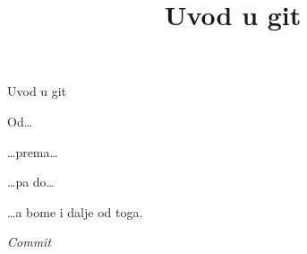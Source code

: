 \documentclass[11pt,twoside,a4paper]{report}
\title{Uvod u git}
\begin{document}
\begin{titlepage}
	\vspace*{3cm}

	\begin{center}
		\Huge Uvod u git
	\end{center}

	\vspace*{2cm}

	Od\dots

	

	\dots{}prema\dots

	

	\dots{}pa do\dots

	

	\dots{}a bome i dalje od toga.

	\vspace*{1cm}

	\begin{center}
		\emph{Commit}
		
	\end{center}

\end{titlepage}

\tableofcontents















%

\printindex
\end{document}
